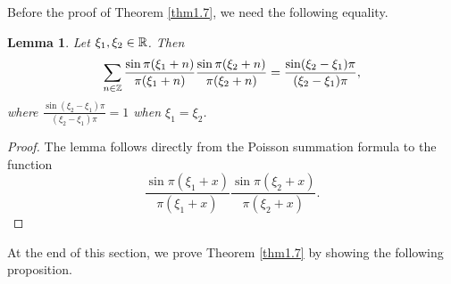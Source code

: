 \documentclass[12pt,psfig,reqno]{amsart}
\numberwithin{equation}{section}
\theoremstyle{plain}
\newtheorem{lem}[thm]{Lemma}
\begin{document}
Before the proof of Theorem \ref{thm1.7}, we need the following equality. 
\begin{lem}\label{thm4.7}
	Let $\xi_1,\xi_2\in\Bbb R$. 
	Then
	$$
	\sum_{n\in\Bbb Z}\frac{\sin\pi(\xi_1+n)}{\pi(\xi_1+n)}\frac{\sin\pi(\xi_2+n)}{\pi(\xi_2+n)}=\frac{\sin(\xi_2-\xi_1)\pi}{(\xi_2-\xi_1)\pi},  
	$$
where $\frac{\sin(\xi_2-\xi_1)\pi}{(\xi_2-\xi_1)\pi}=1$ when $\xi_1=\xi_2$. 
\end{lem}
\begin{proof}
	The lemma follows directly from the Poisson summation formula to the function 
	$$
	\frac{\sin\pi(\xi_1+x)}{\pi(\xi_1+x)}\frac{\sin\pi(\xi_2+x)}{\pi(\xi_2+x)}. 
	$$
\end{proof}


At the end of this section, we prove Theorem \ref{thm1.7} by showing the following proposition. 
\end{document}
